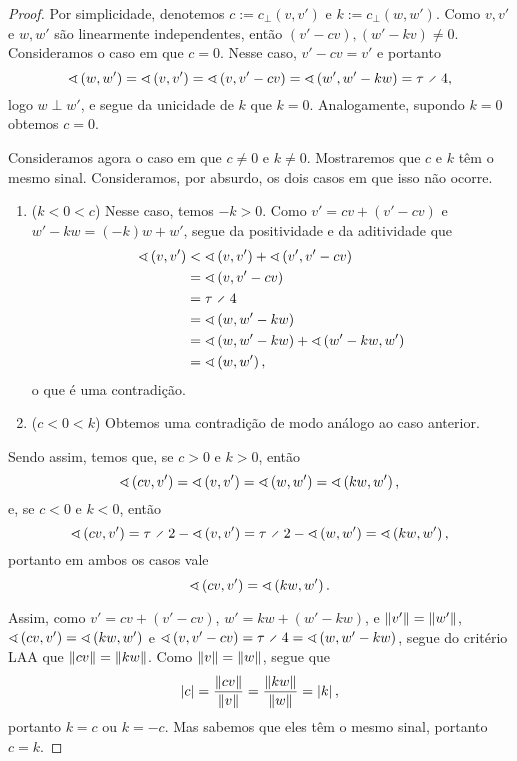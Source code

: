 \begin{proof}
Por simplicidade, denotemos $c:=c_{\perp}(v,v')$ e $k:=c_{\perp}(w,w')$. Como $v,v'$ e $w,w'$ são linearmente independentes, então $(v'-cv),(w'-kv) \neq 0$. Consideramos o caso em que $c=0$. Nesse caso, $v'-cv = v'$ e portanto
	\begin{equation*}
	\ang{w}{w'} = \ang{v}{v'} = \ang{v}{v'-cv} = \ang{w'}{w'-kw} = \tau \div 4,
	\end{equation*}
logo $w \perp w'$, e segue da unicidade de $k$ que $k=0$. Analogamente, supondo $k=0$ obtemos $c=0$.

Consideramos agora o caso em que $c \neq 0$ e $k \neq 0$. Mostraremos que $c$ e $k$ têm o mesmo sinal. Consideramos, por absurdo, os dois casos em que isso não ocorre.
	\begin{enumerate}
	\item ($k<0<c$) Nesse caso, temos $-k>0$. Como $v' = cv + (v'-cv)$ e $w'-kw = (-k)w + w'$, segue da positividade e da aditividade que
		\begin{align*}
		\ang{v}{v'} &< \ang{v}{v'} + \ang{v'}{v'-cv} \\
			&= \ang{v}{v'-cv} \\
			&= \tau \div 4 \\
			&= \ang{w}{w'-kw} \\
			&= \ang{w}{w'-kw} + \ang{w'-kw}{w'} \\
			&= \ang{w}{w'},
		\end{align*}
	o que é uma contradição.

	\item ($c<0<k$) Obtemos uma contradição de modo análogo ao caso anterior.
	\end{enumerate}

Sendo assim, temos que, se $c>0$ e $k>0$, então
	\begin{equation*}
	\sphericalangle\left({cv},{v'}\right) = \sphericalangle\left({v},{v'}\right) = \sphericalangle\left({w},{w'}\right) = \sphericalangle\left({kw},{w'}\right),
	\end{equation*}
e, se $c<0$ e $k<0$, então
	\begin{equation*}
	\ang{cv}{v'} = \tau \div 2 - \ang{v}{v'} = \tau \div 2 - \ang{w}{w'} = \ang{kw}{w'},
	\end{equation*}
portanto em ambos os casos vale
	\begin{equation*}
	\sphericalangle\left({cv},{v'}\right) = \sphericalangle\left({kw},{w'}\right).
	\end{equation*}

Assim, como $v' = cv + (v'-cv)$, $w' = kw + (w'-kw)$, e $\left\Vert{v'}\right\Vert=\left\Vert{w'}\right\Vert$, $\sphericalangle\left({cv},{v'}\right) = \sphericalangle\left({kw},{w'}\right)$ e $\ang{v}{v'-cv} = \tau \div 4 = \ang{w}{w'-kw}$, segue do critério LAA que $\left\Vert{cv}\right\Vert=\left\Vert{kw}\right\Vert$. Como $\left\Vert{v}\right\Vert=\left\Vert{w}\right\Vert$, segue que
	\begin{equation*}
	\left\vert{c}\right\vert = \frac{\left\Vert{cv}\right\Vert}{\left\Vert{v}\right\Vert} = \frac{\left\Vert{kw}\right\Vert}{\left\Vert{w}\right\Vert} = \left\vert{k}\right\vert,
	\end{equation*}
portanto $k=c$ ou $k=-c$. Mas sabemos que eles têm o mesmo sinal, portanto $c=k$.
\end{proof}

